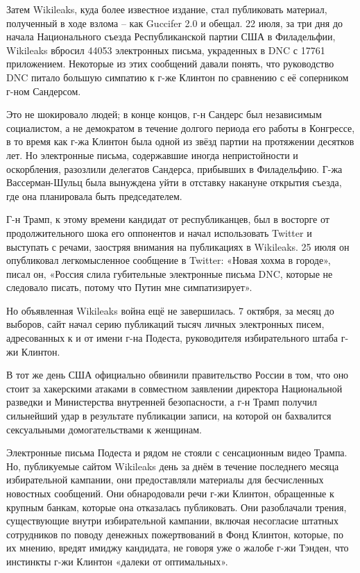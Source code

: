 Затем Wikileaks, куда более известное издание, стал публиковать
материал, полученный в ходе взлома -- как Guccifer 2.0 и обещал. 22
июля, за три дня до начала Национального съезда Республиканской партии
США в Филадельфии, Wikileaks вбросил 44053 электронных письма,
украденных в DNC с 17761 приложением. Некоторые из этих сообщений давали
понять, что руководство DNC питало большую симпатию к г-же Клинтон по
сравнению с её соперником г-ном Сандерсом.

Это не шокировало людей; в конце концов, г-н Сандерс был независимым
социалистом, а не демократом в течение долгого периода его работы в
Конгрессе, в то время как г-жа Клинтон была одной из звёзд партии на
протяжении десятков лет. Но электронные письма, содержавшие иногда
непристойности и оскорбления, разозлили делегатов Сандерса, прибывших в
Филадельфию. Г-жа Вассерман-Шульц была вынуждена уйти в отставку
накануне открытия съезда, где она планировала быть председателем.

Г-н Трамп, к этому времени кандидат от республиканцев, был в восторге от
продолжительного шока его оппонентов и начал использовать Twitter и
выступать с речами, заостряя внимания на публикациях в Wikileaks. 25
июля он опубликовал легкомысленное сообщение в Twitter: «Новая хохма в
городе», писал он, «Россия слила губительные электронные письма DNC,
которые не следовало писать, потому что Путин мне симпатизирует».

Но объявленная Wikileaks война ещё не завершилась. 7 октября, за месяц
до выборов, сайт начал серию публикаций тысяч личных электронных писем,
адресованных к и от имени г-на Подеста, руководителя избирательного
штаба г-жи Клинтон.

В тот же день США официально обвинили правительство России в том, что
оно стоит за хакерскими атаками в совместном заявлении директора
Национальной разведки и Министерства внутренней безопасности, а г-н
Трамп получил сильнейший удар в результате публикации записи, на которой
он бахвалится сексуальными домогательствами к женщинам.

Электронные письма Подеста и рядом не стояли с сенсационным видео
Трампа. Но, публикуемые сайтом Wikileaks день за днём в течение
последнего месяца избирательной кампании, они предоставляли материалы
для бесчисленных новостных сообщений. Они обнародовали речи г-жи
Клинтон, обращенные к крупным банкам, которые она отказалась
публиковать. Они разоблачали трения, существующие внутри избирательной
кампании, включая несогласие штатных сотрудников по поводу денежных
пожертвований в Фонд Клинтон, которые, по их мнению, вредят имиджу
кандидата, не говоря уже о жалобе г-жи Тэнден, что инстинкты г-жи
Клинтон «далеки от оптимальных».

